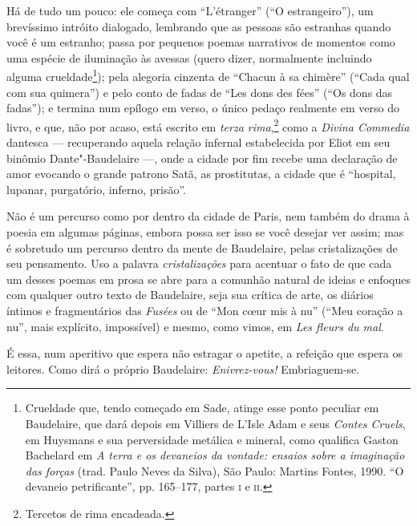 Há de tudo um pouco: ele começa com “L’étranger” (“O estrangeiro”), um
brevíssimo intróito dialogado, lembrando que as pessoas são estranhas
quando você é um estranho; passa por pequenos poemas narrativos de
momentos como uma espécie de iluminação às avessas (quero dizer,
normalmente incluindo alguma crueldade\footnote{ Crueldade que, tendo
começado em Sade, atinge esse ponto peculiar em Baudelaire, que dará
depois em Villiers de L’Isle Adam e seus \textit{Contes Cruels}, em Huysmans e
sua perversidade metálica e mineral, como qualifica Gaston Bachelard em
\textit{A terra e os devaneios da vontade: ensaios sobre a imaginação das
forças} (trad. Paulo Neves da Silva), São Paulo: Martins Fontes,
1990. “O devaneio petrificante”, pp. 165--177, partes \textsc{i} e \textsc{ii}.}); pela
alegoria cinzenta de “Chacun à sa chimère” (“Cada qual com sua quimera”)
e pelo conto de fadas de “Les dons des fées” (“Os dons das fadas”); e
termina num epílogo em verso, o único pedaço realmente em verso do
livro, e que, não por acaso, está escrito em \textit{terza
rima},\footnote{ Tercetos de rima encadeada.} como a \textit{Divina
Commedia} dantesca --- recuperando aquela relação infernal estabelecida
por Eliot em seu binômio Dante"-Baudelaire ---, onde a cidade por fim
recebe uma declaração de amor evocando o grande patrono Satã, as
prostitutas, a cidade que é “hospital, lupanar, purgatório, inferno,
prisão”.

Não é um percurso como por dentro da cidade de Paris, nem também do
drama à poesia em algumas páginas, embora possa ser isso se você
desejar ver assim; mas é sobretudo um percurso dentro da mente de
Baudelaire, pelas cristalizações de seu pensamento. Uso a palavra
\textit{cristalizações} para acentuar o fato de que cada um desses
poemas em prosa se abre para a comunhão natural de ideias e enfoques
com qualquer outro texto de Baudelaire, seja sua crítica de arte, os
diários íntimos e fragmentários das \textit{Fusées} ou de “Mon
c\oe ur mis à nu” (“Meu coração a nu”, mais explícito, impossível) e
mesmo, como vimos, em \textit{Les fleurs du mal}. 

É essa, num aperitivo que espera não estragar o apetite, a refeição que espera os leitores. Como dirá o próprio Baudelaire: \textit{Enivrez-vous!} Embriaguem-se.


